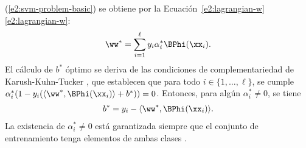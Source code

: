 (\ref{e2:svm-problem-basic}) se obtiene por la
 \iflatexml{}Ecuación~\ref{e2:lagrangian-w}\else\autoref{e2:lagrangian-w}\fi:
%
\begin{align*}
  \ww^* = \sum_{i=1}^\ell y_i\alpha^*_i\BPhi(\xx_i).
\end{align*}
%
El cálculo de $b^*$ óptimo se deriva de las condiciones de
complementariedad de Karush-Kuhn-Tucker \cite{kkt,bottou}, que
establecen que para todo $i\in\{1,\ldots,\ell\}$, se cumple
$\alpha^*_i(1-y_i(\langle\ww^*,\BPhi(\xx_i)\rangle+b^*))=0$. Entonces,
para algún $\alpha^*_i\neq0$, se tiene
%
\begin{align}
  b^* = y_i - \langle\ww^*,\BPhi(\xx_i)\rangle .
\end{align}
%
La existencia de $\alpha^*_i\neq0$ está garantizada siempre que el
conjunto de entrenamiento tenga elementos de ambas clases
\cite{glasmachers}.
